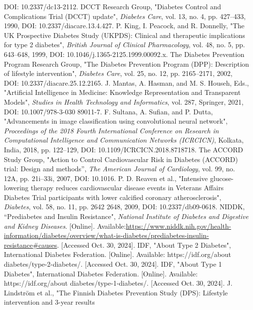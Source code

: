 \documentclass[conference]{IEEEtran}
\begin{document}
\begin{thebibliography}{00}
DOI: 10.2337/dc13-2112.
 DCCT Research Group, "Diabetes Control and Complications Trial (DCCT) update", \textit{Diabetes Care}, vol. 13, no. 4,
pp. 427–433, 1990, DOI: 10.2337/diacare.13.4.427.
 P. King, I. Peacock, and R. Donnelly, "The UK Prospective Diabetes Study (UKPDS): Clinical and therapeutic
implications for type 2 diabetes", \textit{British Journal of Clinical Pharmacology}, vol. 48, no. 5, pp. 643–648, 1999, DOI:
10.1046/j.1365-2125.1999.00092.x.
 The Diabetes Prevention Program Research Group, "The Diabetes Prevention Program (DPP): Description of
lifestyle intervention", \textit{Diabetes Care}, vol. 25, no. 12, pp. 2165–2171, 2002, DOI: 10.2337/diacare.25.12.2165.
 J. Mantas, A. Hasman, and M. S. Househ, Eds., "Artificial Intelligence in Medicine: Knowledge Representation
and Transparent Models", \textit{Studies in Health Technology and Informatics}, vol. 287, Springer, 2021, DOI: 10.1007/978-3-030
89011-7.
 F. Sultana, A. Sufian, and P. Dutta, "Advancements in image classification using convolutional neural
network", \textit{Proceedings of the 2018 Fourth International Conference on Research in Computational Intelligence and
Communication Networks (ICRCICN)}, Kolkata, India, 2018, pp. 122–129, DOI: 10.1109/ICRCICN.2018.8718718.
 The ACCORD Study Group, "Action to Control Cardiovascular Risk in Diabetes (ACCORD) trial: Design and
methods”, \textit{The American Journal of Cardiology}, vol. 99, no. 12A, pp. 21i–33i, 2007, DOI: 10.1016.
 P. D. Reaven et al., "Intensive glucose-lowering therapy reduces cardiovascular disease events in Veterans
Affairs Diabetes Trial participants with lower calcified coronary atherosclerosis", \textit{Diabetes}, vol. 58, no. 11, pp. 2642
2648, 2009, DOI: 10.2337/db09-0618.
 NIDDK, “Prediabetes and Insulin Resistance", \textit{National Institute of Diabetes and Digestive and Kidney Diseases}. [Online]. Available:\url{https://www.niddk.nih.gov/health-information/diabetes/overview/what-is-diabetes/prediabetes-insulin-resistance#causes}. [Accessed Oct. 30, 2024].
 IDF, "About Type 2 Diabetes", International Diabetes Federation. [Online]. Available: https://idf.org/about
diabetes/type-2-diabetes/. [Accessed Oct. 30, 2024].
 IDF, "About Type 1 Diabetes", International Diabetes Federation. [Online]. Available: https://idf.org/about
diabetes/type-1-diabetes/. [Accessed Oct. 30, 2024].
 J. Lindström et al., "The Finnish Diabetes Prevention Study (DPS): Lifestyle intervention and 3-year results

\end{thebibliography}
\end{document}
